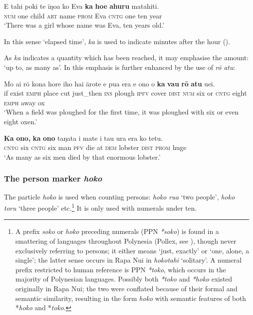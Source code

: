 \ea\label{ex:4.27}
\gll E tahi poki te {\ꞌ}īŋoa ko Eva \textbf{ka} \textbf{ho{\ꞌ}e} \textbf{{\ꞌ}ahuru} matahiti. \\
\textsc{num} one child \textsc{art} name \textsc{prom} Eva \textsc{cntg} one ten year \\

\glt
‘There was a girl whose name was Eva, ten years old.’ \textstyleExampleref{[R210.001]} 
\z

In this sense ‘elapsed time’, \textit{ka} is used to indicate minutes after the hour (). 

As \textit{ka} indicates a quantity which has been reached, it may emphasise the amount: ‘up to, as many as’. In  this emphasis is further enhanced by the use of \textit{rō atu}:

\ea\label{ex:4.28}
\gll Mo ai rō kona hore iho hai {\ꞌ}ārote e pu{\ꞌ}a era e ono  {\ꞌ}o \textbf{ka} \textbf{va}{\ꞌ}\textbf{u} \textbf{rō} \textbf{atu} {\ꞌ}uei.\\
if exist \textsc{emph} place cut just\_then \textsc{ins} plough \textsc{ipfv} cover \textsc{dist} \textsc{num} six  or \textsc{cntg} eight \textsc{emph} away ox\\

\glt 
‘When a field was ploughed for the first time, it was ploughed with six or even eight oxen.’ \textstyleExampleref{[R539-1.110–111]}
\z

\ea\label{ex:4.29}
\gll \textbf{Ka} \textbf{ono,} \textbf{ka} \textbf{ono} taŋata i mate {\ꞌ}i tau {\ꞌ}ura era ko tetu. \\
\textsc{cntg} six \textsc{cntg} six man \textsc{pfv} die at \textsc{dem} lobster \textsc{dist} \textsc{prom} huge \\

\glt 
‘As many as six men died by that enormous lobster.’ \textstyleExampleref{[Mtx-4-05.014]}
\z

\subsubsection[The person marker hoko]{The person marker \textit{hoko}}\label{sec:4.3.2.3}

The particle \textit{hoko} is used when counting persons: \textit{hoko rua} ‘two people’, \textit{hoko toru} ‘three people’ etc.\footnote{\label{fn:175}A prefix \textit{soko} or \textit{hoko} preceding numerals (PPN \textit{*soko}) is found in a smattering of languages throughout Polynesia (Pollex, see \citealt{GreenhillClark2011}), though never exclusively referring to persons; it either means ‘just, exactly’ or ‘one, alone, a single’; the latter sense occurs in Rapa Nui in \textit{hokotahi} ‘solitary’. 
A numeral prefix restricted to human reference is PPN \textit{*toko}, which occurs in the majority of Polynesian languages. Possibly both \textit{*toko} and \textit{*hoko} existed originally in Rapa Nui; the two were conflated because of their formal and semantic similarity, resulting in the form \textit{hoko} with semantic features of both *\textit{hoko} and *\textit{toko}.} It is only used with numerals under ten. 

